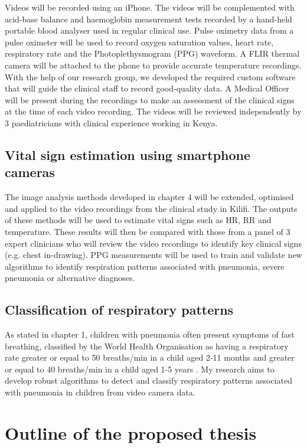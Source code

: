 Videos will be recorded using an iPhone. The videos  will be complemented with acid-base balance and haemoglobin measurement tests recorded by a hand-held portable blood analyser used in regular clinical use. Pulse oximetry data from a pulse oximeter will be used to record oxygen saturation values, heart rate, respiratory rate and the Photoplethysmogram (PPG) waveform. A FLIR thermal camera will be attached to the phone to provide accurate temperature recordings. With the help of our research group, we developed the required custom software that will guide the clinical staff to record good-quality data. A Medical Officer will be present during the recordings to make an assessment of the clinical signs at the time of each video recording. The videos will be reviewed independently by 3 paediatricians with clinical experience working in Kenya. 

\subsection{Vital sign estimation using smartphone cameras}

The image analysis methods developed in chapter 4 will be extended, optimised and applied to the video recordings from the clinical study in Kilifi. The outputs of these methods will be used to estimate vital signs such as HR, RR and temperature. These results will then be compared with those from a panel of 3 expert clinicians who will review the video recordings to identify key clinical signs (e.g. chest in-drawing). PPG measurements will be used to train and validate new algorithms to identify respiration patterns associated with pneumonia, severe pneumonia or alternative diagnoses. 

\subsection{Classification of respiratory patterns}

As stated in chapter 1, children with pneumonia often present symptoms of fast breathing, classified by the World Health Organisation as having a respiratory rate greater or equal to 50 breaths/min in a child aged 2-11 months and greater or equal to 40 breaths/min in a child aged 1-5 years \cite{world2013pocket}. My research aims to develop robust algorithms to detect and classify respiratory patterns associated with pneumonia in children from video camera data. 

\section{Outline of the proposed thesis}

